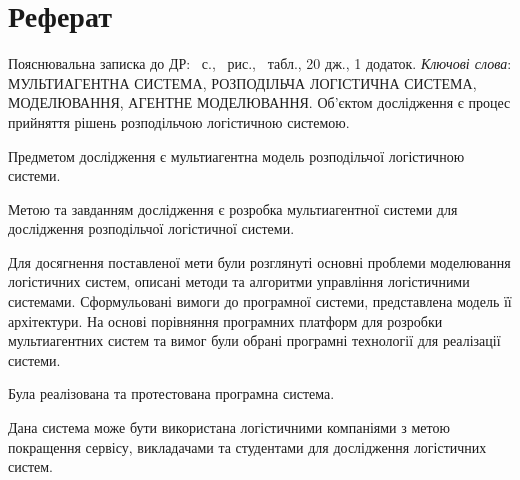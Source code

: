 \section*{Реферат}
Пояснювальна записка до ДР: \pageref{LastPage}~с., \totalfigures~рис., \totaltables~табл., 20 дж., 1 додаток. \bigbreak
\textit{Ключові слова}: \MakeUppercase{мультиагентна система, розподільча логістична система, моделювання, агентне моделювання}. \bigbreak
Об'єктом дослідження є процес прийняття рішень розподільчою логістичною системою. 

Предметом дослідження є мультиагентна модель розподільчої логістичною системи.

Метою та завданням дослідження є розробка мультиагентної системи для дослідження розподільчої логістичної системи.

Для досягнення поставленої мети були розглянуті основні проблеми моделювання логістичних систем, описані методи та алгоритми управління логістичними системами. Сформульовані вимоги до програмної системи, представлена модель її архітектури. На основі порівняння програмних платформ для розробки мультиагентних систем та вимог були обрані програмні технології для реалізації системи.

Була реалізована та протестована програмна система.

Дана система може бути використана логістичними компаніями з метою покращення сервісу, викладачами та студентами для дослідження логістичних систем.
